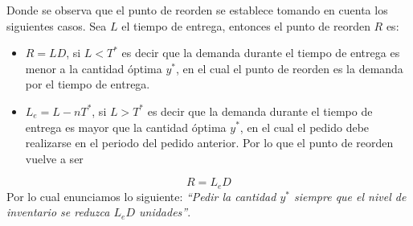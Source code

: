 Donde se observa que el punto de reorden se establece tomando en cuenta los siguientes casos. Sea $L$ el tiempo de entrega, entonces el punto de reorden $R$ es:
\begin{itemize}
	\item $R = LD$, si $L < T^*$ es decir que la demanda durante el tiempo de entrega es menor a la cantidad óptima $y^*$, en el cual el punto de reorden es la demanda por el tiempo de entrega.
	\item $L_e = L - nT^*$, si $L > T^*$ es decir que la demanda durante el tiempo de entrega es mayor que la cantidad óptima $y^*$, en el cual el pedido debe realizarse en el periodo del pedido anterior. Por lo que el punto de reorden vuelve a ser
\end{itemize}
$$
	R = L_e D
$$
Por lo cual enunciamos lo siguiente: \textsl{``Pedir la cantidad $y^*$ siempre que el nivel de inventario se reduzca $L_e D$ unidades''}.

